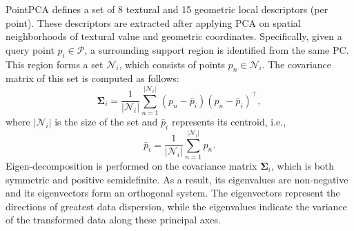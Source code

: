 \documentclass[final,3p,times,twocolumn]{elsarticle}
\begin{document}
PointPCA defines a set of 8 textural and 15 geometric local descriptors (per point). These descriptors are extracted after applying \gls{PCA} on spatial neighborhoods of textural value and geometric coordinates. Specifically, given a query point $p_i \in \mathcal{P}$, a surrounding support region is identified from the same \gls{PC}. This region forms a set $\mathcal{N}_i$, which consists of points $p_n \in \mathcal{N}_i$. The covariance matrix of this set is computed as follows:
\begin{equation} \label{eq_covariance}
\mathbf{\Sigma}_i = \frac{1}{|\mathcal{N}_i|} \sum_{n=1}^{|\mathcal{N}_i|} ({p}_n - \bar{{p}}_i)({p}_n - \bar{{p}}_i)^\top,
\end{equation}
where $|\mathcal{N}_i|$ is the size of the set and $\bar{{p}}_i$ represents its centroid, i.e.,
\begin{equation} \label{eq_centroid}
\bar{{p}}_i = \frac{1}{|\mathcal{N}_i|} \sum_{n=1}^{|\mathcal{N}_i|} {p}_n.
\end{equation}
Eigen-decomposition is performed on the covariance matrix $\mathbf{\Sigma}_i$, which is both symmetric and positive semidefinite. As a result, its eigenvalues are non-negative and its eigenvectors form an orthogonal system. The eigenvectors represent the directions of greatest data dispersion, while the eigenvalues indicate the variance of the transformed data along these principal axes.
\end{document}
